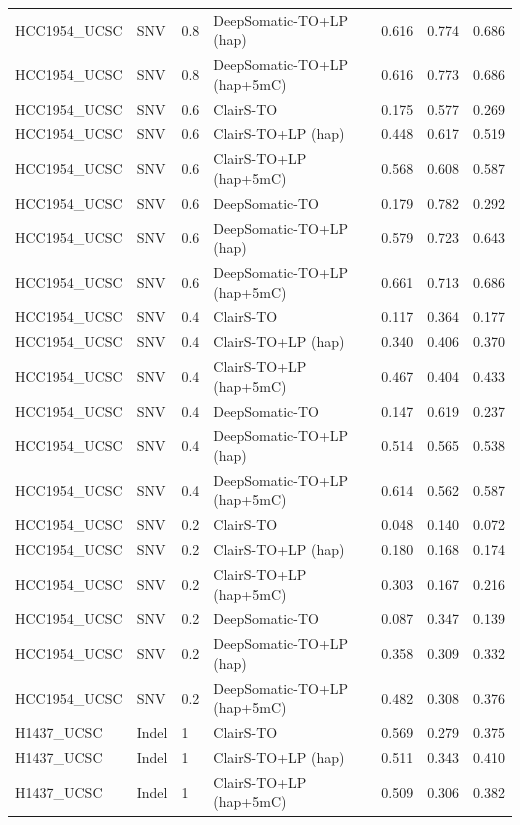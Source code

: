 \documentclass[pdflatex,sn-nature]{sn-jnl}
\begin{document}
{\begin{longtable}{@{}llllccc@{}}
  HCC1954\_UCSC & SNV & 0.8 & DeepSomatic-TO+LP (hap) & 0.616 & 0.774 & 0.686 \\
  HCC1954\_UCSC & SNV & 0.8 & DeepSomatic-TO+LP (hap+5mC) & 0.616 & 0.773 & 0.686 \\
  HCC1954\_UCSC & SNV & 0.6 & ClairS-TO & 0.175 & 0.577 & 0.269 \\
  HCC1954\_UCSC & SNV & 0.6 & ClairS-TO+LP (hap) & 0.448 & 0.617 & 0.519 \\
  HCC1954\_UCSC & SNV & 0.6 & ClairS-TO+LP (hap+5mC) & 0.568 & 0.608 & 0.587 \\
  HCC1954\_UCSC & SNV & 0.6 & DeepSomatic-TO & 0.179 & 0.782 & 0.292 \\
  HCC1954\_UCSC & SNV & 0.6 & DeepSomatic-TO+LP (hap) & 0.579 & 0.723 & 0.643 \\
  HCC1954\_UCSC & SNV & 0.6 & DeepSomatic-TO+LP (hap+5mC) & 0.661 & 0.713 & 0.686 \\
  HCC1954\_UCSC & SNV & 0.4 & ClairS-TO & 0.117 & 0.364 & 0.177 \\
  HCC1954\_UCSC & SNV & 0.4 & ClairS-TO+LP (hap) & 0.340 & 0.406 & 0.370 \\
  HCC1954\_UCSC & SNV & 0.4 & ClairS-TO+LP (hap+5mC) & 0.467 & 0.404 & 0.433 \\
  HCC1954\_UCSC & SNV & 0.4 & DeepSomatic-TO & 0.147 & 0.619 & 0.237 \\
  HCC1954\_UCSC & SNV & 0.4 & DeepSomatic-TO+LP (hap) & 0.514 & 0.565 & 0.538 \\
  HCC1954\_UCSC & SNV & 0.4 & DeepSomatic-TO+LP (hap+5mC) & 0.614 & 0.562 & 0.587 \\
  HCC1954\_UCSC & SNV & 0.2 & ClairS-TO & 0.048 & 0.140 & 0.072 \\
  HCC1954\_UCSC & SNV & 0.2 & ClairS-TO+LP (hap) & 0.180 & 0.168 & 0.174 \\
  HCC1954\_UCSC & SNV & 0.2 & ClairS-TO+LP (hap+5mC) & 0.303 & 0.167 & 0.216 \\
  HCC1954\_UCSC & SNV & 0.2 & DeepSomatic-TO & 0.087 & 0.347 & 0.139 \\
  HCC1954\_UCSC & SNV & 0.2 & DeepSomatic-TO+LP (hap) & 0.358 & 0.309 & 0.332 \\
  HCC1954\_UCSC & SNV & 0.2 & DeepSomatic-TO+LP (hap+5mC) & 0.482 & 0.308 & 0.376 \\
  H1437\_UCSC & Indel & 1 & ClairS-TO & 0.569 & 0.279 & 0.375 \\
  H1437\_UCSC & Indel & 1 & ClairS-TO+LP (hap) & 0.511 & 0.343 & 0.410 \\
  H1437\_UCSC & Indel & 1 & ClairS-TO+LP (hap+5mC) & 0.509 & 0.306 & 0.382 \\

\end{longtable}}
\end{document}
